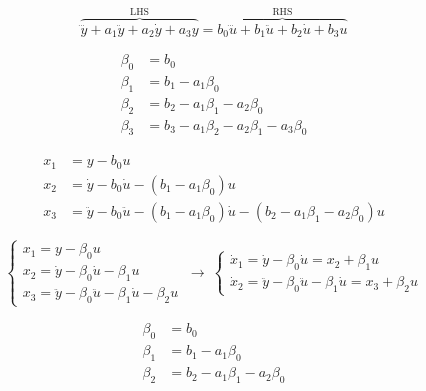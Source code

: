 \documentclass[11pt,a4paper]{article}
\begin{document}
\begin{ornek}
\[
\overbrace{\dddot{y}+a_1\ddot{y}+a_2\dot{y}+a_3y}^{\text{LHS}}=\overbrace{b_0\dddot{u}+b_1\ddot{u}+b_2\dot{u}+b_3u}^{\text{RHS}}
\]

\begin{align*}
\beta_0&=b_0\\
\beta_1&=b_1-a_1\beta_0\\
\beta_2&=b_2-a_1\beta_1-a_2\beta_0\\
\beta_3&=b_3-a_1\beta_2-a_2\beta_1-a_3\beta_0
\end{align*}

\begin{align*}
x_1&=y-b_0u\\
x_2&=\dot{y}-b_0\dot{u}-(b_1-a_1\beta_0)u\\
x_3&=\ddot{y}-b_0\ddot{u}-(b_1-a_1\beta_0)\dot{u}-(b_2-a_1\beta_1-a_2\beta_0)u
\end{align*}
\end{ornek}


\[
\left\{\begin{array}{l}
x_1=y-\beta_0u\\
x_2=\dot{y}-\beta_0\dot{u}-\beta_1u\\
x_3=\ddot{y}-\beta_0\ddot{u}-\beta_1\dot{u}-\beta_2u
\end{array}\right.
\ \to\
\left\{\begin{array}{l}
\dot{x}_1=\dot{y}-\beta_0\dot{u}=x_2+\beta_1u\\
\dot{x}_2=\ddot{y}-\beta_0\ddot{u}-\beta_1\dot{u}=x_3+\beta_2u
\end{array}\right.
\]

\begin{align*}
\beta_0&=b_0\\
\beta_1&=b_1-a_1\beta_0\\
\beta_2&=b_2-a_1\beta_1-a_2\beta_0
\end{align*}
\end{document}
